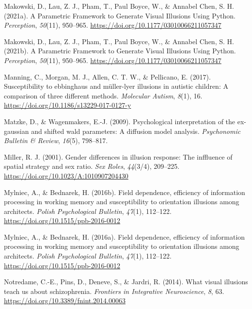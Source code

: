 \documentclass[
  man,floatsintext]{apa6}
\newlength{\cslhangindent}
\newlength{\cslentryspacingunit} %
\newenvironment{CSLReferences}[2] %
 {%
  \setlength{\parindent}{0pt}
  \ifodd #1
  \let\oldpar\par
  \def\par{\hangindent=\cslhangindent\oldpar}
  \fi
  \setlength{\parskip}{#2\cslentryspacingunit}
 }%
 {}
\begin{document}
\begin{CSLReferences}{1}{0}
\leavevmode{}%
Makowski, D., Lau, Z. J., Pham, T., Paul Boyce, W., \& Annabel Chen, S. H. (2021a). A Parametric Framework to Generate Visual Illusions Using Python. \emph{Perception}, \emph{50}(11), 950--965. \url{https://doi.org/10.1177/03010066211057347}

\leavevmode{}%
Makowski, D., Lau, Z. J., Pham, T., Paul Boyce, W., \& Annabel Chen, S. H. (2021b). A Parametric Framework to Generate Visual Illusions Using Python. \emph{Perception}, \emph{50}(11), 950--965. \url{https://doi.org/10.1177/03010066211057347}

\leavevmode{}%
Manning, C., Morgan, M. J., Allen, C. T. W., \& Pellicano, E. (2017). Susceptibility to ebbinghaus and müller-lyer illusions in autistic children: A comparison of three different methods. \emph{Molecular Autism}, \emph{8}(1), 16. \url{https://doi.org/10.1186/s13229-017-0127-y}

\leavevmode{}%
Matzke, D., \& Wagenmakers, E.-J. (2009). Psychological interpretation of the ex-gaussian and shifted wald parameters: A diffusion model analysis. \emph{Psychonomic Bulletin \& Review}, \emph{16}(5), 798--817.

\leavevmode{}%
Miller, R. J. (2001). Gender differences in illusion response: The inffluence of spatial strategy and sex ratio. \emph{Sex Roles}, \emph{44}(3/4), 209--225. \url{https://doi.org/10.1023/A:1010907204430}

\leavevmode{}%
Mylniec, A., \& Bednarek, H. (2016b). Field dependence, efficiency of information processing in working memory and susceptibility to orientation illusions among architects. \emph{Polish Psychological Bulletin}, \emph{47}(1), 112--122. \url{https://doi.org/10.1515/ppb-2016-0012}

\leavevmode{}%
Mylniec, A., \& Bednarek, H. (2016a). Field dependence, efficiency of information processing in working memory and susceptibility to orientation illusions among architects. \emph{Polish Psychological Bulletin}, \emph{47}(1), 112--122. \url{https://doi.org/10.1515/ppb-2016-0012}

\leavevmode{}%
Notredame, C.-E., Pins, D., Deneve, S., \& Jardri, R. (2014). What visual illusions teach us about schizophrenia. \emph{Frontiers in Integrative Neuroscience}, \emph{8}, 63. \url{https://doi.org/10.3389/fnint.2014.00063}


\end{CSLReferences}
\end{document}
